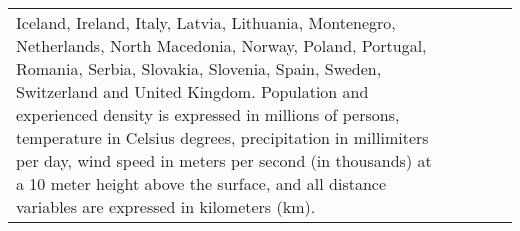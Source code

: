 \begin{table}
\begin{tabular}[t]{lllrr}
{Iceland, Ireland, Italy, Latvia, Lithuania, Montenegro, Netherlands, North Macedonia,
Norway, Poland, Portugal, Romania, Serbia, Slovakia, Slovenia, Spain, Sweden, Switzerland and United Kingdom. Population and experienced density is expressed in millions of persons, temperature in Celsius degrees, precipitation in millimiters per day, wind speed in meters per second (in thousands) at a 10 meter height above the surface, and all distance variables are expressed in kilometers (km).}\\
\end{tabular}
\end{table}
